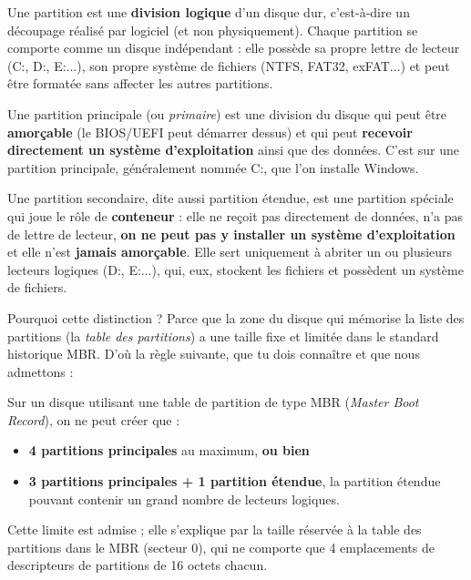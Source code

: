 \documentclass[11pt]{article}
\newcommand{\cle}[1]{{\popxbold\color{popdark}#1}}
\begin{document}
\begin{definition}[Partition]
Une \cle{partition} est une \textbf{division logique} d'un disque dur, c'est-à-dire un découpage réalisé par logiciel (et non physiquement). Chaque partition se comporte comme un disque indépendant : elle possède sa propre lettre de lecteur (C:, D:, E:...), son propre système de fichiers (NTFS, FAT32, exFAT...) et peut être formatée sans affecter les autres partitions.
\end{definition}

\begin{definition}
Une \cle{partition principale} (ou \emph{primaire}) est une division du disque qui peut être \textbf{amorçable} (le BIOS/UEFI peut démarrer dessus) et qui peut \textbf{recevoir directement un système d'exploitation} ainsi que des données. C'est sur une partition principale, généralement nommée C:, que l'on installe Windows.
\end{definition}

\begin{definition}
Une \cle{partition secondaire}, dite aussi \cle{partition étendue}, est une partition spéciale qui joue le rôle de \textbf{conteneur} : elle ne reçoit pas directement de données, n'a pas de lettre de lecteur, \textbf{on ne peut pas y installer un système d'exploitation} et elle n'est \textbf{jamais amorçable}. Elle sert uniquement à abriter un ou plusieurs \cle{lecteurs logiques} (D:, E:...), qui, eux, stockent les fichiers et possèdent un système de fichiers.
\end{definition}

Pourquoi cette distinction ? Parce que la zone du disque qui mémorise la liste des partitions (la \emph{table des partitions}) a une taille fixe et limitée dans le standard historique MBR. D'où la règle suivante, que tu dois connaître et que nous admettons :

\begin{propriete}
Sur un disque utilisant une table de partition de type \cle{MBR} (\emph{Master Boot Record}), on ne peut créer que :
\begin{itemize}
\item \textbf{4 partitions principales} au maximum, \textbf{ou bien}
\item \textbf{3 partitions principales + 1 partition étendue}, la partition étendue pouvant contenir un grand nombre de lecteurs logiques.
\end{itemize}
Cette limite est admise ; elle s'explique par la taille réservée à la table des partitions dans le MBR (secteur 0), qui ne comporte que 4 emplacements de descripteurs de partitions de 16 octets chacun.
\end{propriete}
\end{document}
